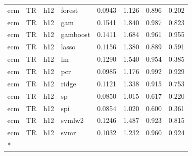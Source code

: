 \begin{ThreePartTable}
\begin{longtable}[t]{llclcccc}
ecm & TR & h12 & forest & 0.0943 & 1.126 & 0.896 & 0.202\\
ecm & TR & h12 & gam & 0.1541 & 1.840 & 0.987 & 0.823\\
ecm & TR & h12 & gamboost & 0.1411 & 1.684 & 0.961 & 0.955\\
ecm & TR & h12 & lasso & 0.1156 & 1.380 & 0.889 & 0.591\\
ecm & TR & h12 & lm & 0.1290 & 1.540 & 0.954 & 0.385\\
ecm & TR & h12 & pcr & 0.0985 & 1.176 & 0.992 & 0.929\\
ecm & TR & h12 & ridge & 0.1121 & 1.338 & 0.915 & 0.753\\
ecm & TR & h12 & sp & 0.0850 & 1.015 & 0.617 & 0.220\\
ecm & TR & h12 & spi & 0.0854 & 1.020 & 0.600 & 0.361\\
ecm & TR & h12 & svmlw2 & 0.1246 & 1.487 & 0.923 & 0.815\\
ecm & TR & h12 & svmr & 0.1032 & 1.232 & 0.960 & 0.924\\*
\end{longtable}
\end{ThreePartTable}
\endgroup{}
